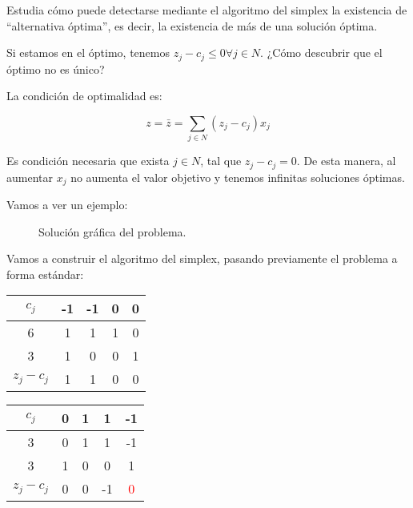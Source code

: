 \begin{problem}

Estudia cómo puede detectarse mediante el algoritmo del simplex la existencia de “alternativa óptima”, es decir, la existencia de más de una solución óptima.
\solution

Si estamos en el óptimo, tenemos $z_j - c_j ≤ 0 ∀j∈N$. ¿Cómo descubrir que el óptimo no es único?

La condición de optimalidad es:

\[z = \bar{z} = \sum_{j∈N}(z_j - c_j)x_j\]

Es condición necesaria que exista $j∈N$, tal que $z_j - c_j = 0$. De esta manera, al aumentar $x_j$ no aumenta el valor objetivo y tenemos infinitas soluciones óptimas.

Vamos a ver un ejemplo:

\begin{ioprob}
\end{ioprob}

\begin{figure}[hbtp]
\centering
{}
\caption{Solución gráfica del problema.}
\end{figure}



Vamos a construir el algoritmo del simplex, pasando previamente el problema a forma estándar:

\begin{table}[hbtp]
\centering
\begin{tabular}{c|cccc}
$c_j$ & -1 & -1 &0&0\\\hline\hline
6&1&1&1&0\\
3&1&0&0&1\\\hline
$z_j - c_j$ & 1&1&0&0
\end{tabular}
\end{table}


\begin{table}[hbtp]
\centering
\begin{tabular}{c|cccc}
$c_j$ & 0 & 1 & 1 & -1\\\hline\hline
3 & 0 & 1 & 1 & -1 \\
3 & 1 & 0 & 0 & 1 \\\hline
$z_j - c_j$ & 0&0&-1& \textcolor{red}{0}
\end{tabular}
\end{table}



\end{problem}
